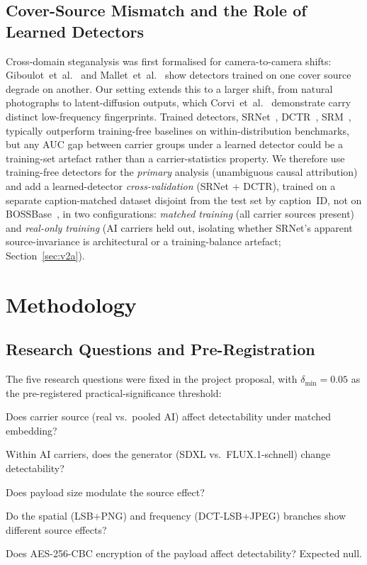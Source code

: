 \documentclass[10pt,twocolumn,a4paper]{article}
\begin{document}
\subsection{Cover-Source Mismatch and the Role of Learned Detectors}
Cross-domain steganalysis was first formalised for camera-to-camera shifts: Giboulot~et~al.~\cite{giboulot2020csm} and Mallet~et~al.~\cite{mallet2024csm} show detectors trained on one cover source degrade on another. Our setting extends this to a larger shift, from natural photographs to latent-diffusion outputs, which Corvi~et~al.~\cite{corvi2023diffusion} demonstrate carry distinct low-frequency fingerprints. Trained detectors, SRNet~\cite{boroumand2019srnet}, DCTR~\cite{holub2015dctr}, SRM~\cite{fridrich2012srm}, typically outperform training-free baselines on within-distribution benchmarks, but any AUC gap between carrier groups under a learned detector could be a training-set artefact rather than a carrier-statistics property. We therefore use training-free detectors for the \emph{primary} analysis (unambiguous causal attribution) and add a learned-detector \emph{cross-validation} (SRNet + DCTR), trained on a separate caption-matched dataset disjoint from the test set by caption~ID, not on BOSSBase~\cite{bas2011boss}, in two configurations: \emph{matched training} (all carrier sources present) and \emph{real-only training} (AI carriers held out, isolating whether SRNet's apparent source-invariance is architectural or a training-balance artefact; Section~\ref{sec:v2a}).

\section{Methodology}
\label{sec:methods}

\subsection{Research Questions and Pre-Registration}
The five research questions were fixed in the project proposal, with $\delta_\text{min}\!=\!0.05$ as the pre-registered practical-significance threshold:
\begin{description}[font=\bfseries,leftmargin=1.2em,style=nextline,itemsep=2pt]
\item[RQ1 (primary, confirmatory)] Does carrier source (real vs.\ pooled AI) affect detectability under matched embedding?
\item[RQ2 (primary, confirmatory)] Within AI carriers, does the generator (SDXL vs.\ FLUX.1-schnell) change detectability?
\item[RQ3 (exploratory)] Does payload size modulate the source effect?
\item[RQ4 (exploratory)] Do the spatial (LSB+PNG) and frequency (DCT-LSB+JPEG) branches show different source effects?
\item[RQ5 (verification)] Does AES-256-CBC encryption of the payload affect detectability? Expected null.
\end{description}
\end{document}
